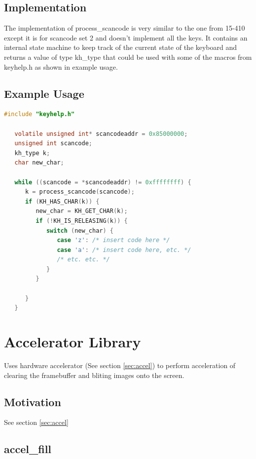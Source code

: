 \documentclass[10pt]{article}
\begin{document}
\subsection{Implementation}

The implementation of process\_scancode is very similar to the one from 15-410 except it is for scancode set 2 and doesn't implement all the keys. It contains an internal state machine to keep track of the current state of the keyboard and returns a value of type kh\_type that could be used with some of the macros from keyhelp.h as shown in example usage.

\subsection{Example Usage}

\begin{lstlisting}[basicstyle=\footnotesize,language=C]
   #include "keyhelp.h"
 
   volatile unsigned int* scancodeaddr = 0x85000000;
   unsigned int scancode;
   kh_type k;
   char new_char;
 
   while ((scancode = *scancodeaddr) != 0xffffffff) {
      k = process_scancode(scancode);
      if (KH_HAS_CHAR(k)) {
         new_char = KH_GET_CHAR(k);
         if (!KH_IS_RELEASING(k)) {
            switch (new_char) {
               case 'z': /* insert code here */
               case 'a': /* insert code here, etc. */ 
               /* etc. etc. */
            }
         }
 
      }
   }
\end{lstlisting}

\section{Accelerator Library}

\label{sec:accel_lib}

Uses hardware accelerator (See section \ref{sec:accel}) to perform acceleration of clearing the framebuffer and bliting images onto the screen.

\subsection{Motivation}

See section \ref{sec:accel}

\subsection{accel\_fill}
\end{document}
